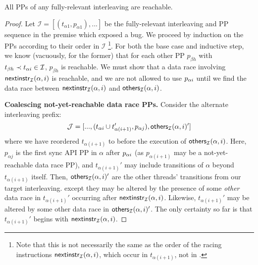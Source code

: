 \begin{lemma}
	All PPs of any fully-relevant interleaving are reachable.
	\label{lem:saturation}
\end{lemma}

\newcommand\pbh{\ensuremath{p_{\beta{}h}}}
\newcommand\paj{\ensuremath{p_{\alpha{}j}}}
\newcommand\pbk{\ensuremath{p_{\beta{}k}}}
\newcommand\tbh{\ensuremath{t_{\beta{}h}}}
\newcommand\coalesce[1]{\ensuremath{\mathsf{coalesce}(#1)}}

\begin{proof}
Let $\mathcal{I} = [(t_{\alpha{}1}, p_{\alpha{}1}), ...]$ be the fully-relevant interleaving and PP sequence in the premise which exposed a bug.
We proceed by induction on the PPs according to their order in $\mathcal{I}$%
\footnote{Note that this is not necessarily the same as the order of the racing instructions
	$\mathsf{nextinstr}_{\mathcal{I}}(\alpha,i)$, which occur in $t_{\alpha{}(i+1)}$, not in \tai.
}.
For both the base case and inductive step, we know (vacuously, for the former) that for each other PP $\pbh$ with $\tbh \prec \tai \in \mathcal{I}$, $\pbh$ is reachable.
We must show that a data race involving $\mathsf{nextinstr}_{\mathcal{I}}(\alpha,i)$
is reachable, and we are not allowed to use $p_{\alpha{}i}$ until we find the data race between $\mathsf{nextinstr}_{\mathcal{I}}(\alpha,i)$ and $\mathsf{others}_{\mathcal{I}}(\alpha,i)$.

{\bf Coalescing not-yet-reachable data race PPs.}
Consider the alternate interleaving prefix:
\[
	\mathcal{J} = [..., (\tai \cup t_{\alpha{}(i+1)}', \paj), \ppothers{\mathcal{I}}{\alpha}{i}' ]
\]
where we have reordered $t_{\alpha{}(i+1)}$ to before the execution of $\mathsf{others}_{\mathcal{I}}(\alpha,i)$.
Here, $\paj$ is the first sync API PP in $\alpha$ after $p_{\alpha{}i}$ (as $p_{\alpha(i+1)}$ may be a not-yet-reachable data race PP),
and $t_{\alpha{}(i+1)}'$ may include transitions of $\alpha$ beyond $t_{\alpha{}(i+1)}$ itself.
Then, $\mathsf{others}_{\mathcal{I}}(\alpha,i)'$ are the other threads' transitions from our target interleaving.
except they may be altered by the presence of some {\em other} data race in $t_{\alpha{}(i+1)}'$ occurring after $\mathsf{nextinstr}_{\mathcal{I}}(\alpha,i)$.
Likewise, $t_{\alpha{}(i+1)}'$ may be altered by some other data race in $\mathsf{others}_{\mathcal{I}}(\alpha,i)'$.
The only certainty so far is that $t_{\alpha{}(i+1)}'$ begins with $\mathsf{nextinstr}_{\mathcal{I}}(\alpha,i)$.


\end{proof}
